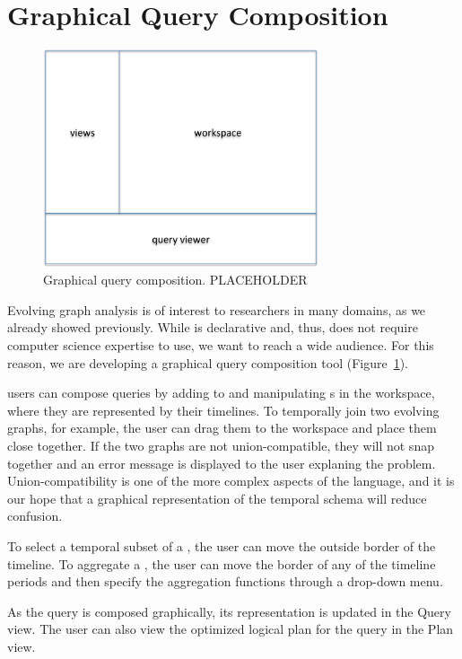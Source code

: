 \section{Graphical Query Composition}
\label{sec:gui}

\begin{figure}
\begin{center}
\includegraphics[width=3.2in]{figs/ui.pdf}
\caption{Graphical query composition. PLACEHOLDER}
\label{fig:ui}
\end{center}
\end{figure}

Evolving graph analysis is of interest to researchers in many domains,
as we already showed previously.  While \ql is declarative and, thus,
does not require computer science expertise to use, we want to reach a
wide audience.  For this reason, we are developing a graphical query
composition tool \qlui (Figure~\ref{fig:ui}).

\qlui users can compose queries by adding to and manipulating
\tg{}s in the workspace, where they are represented by their
timelines.  To temporally join two evolving graphs, for example, the
user can drag them to the workspace and place them close together.  If
the two graphs are not union-compatible, they will not snap together
and an error message is displayed to the user explaning the problem.
Union-compatibility is one of the more complex aspects of the
language, and it is our hope that a graphical representation of the
\tg temporal schema will reduce confusion.

To select a temporal subset of a \tg, the user can move the outside
border of the timeline.  To aggregate a \tg, the user can move the
border of any of the timeline periods and then specify the aggregation
functions through a drop-down menu.

As the query is composed graphically, its \ql representation is
updated in the Query view.  The user can also view the optimized
logical plan for the query in the Plan view.
